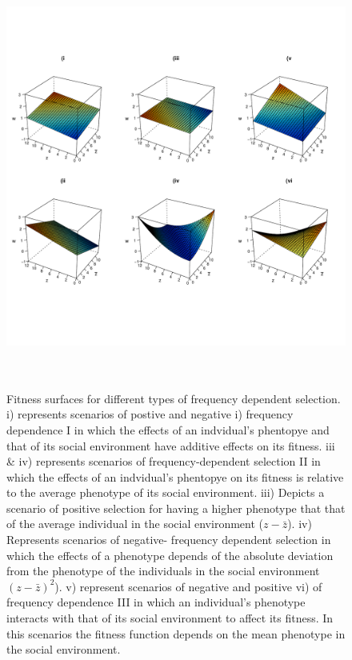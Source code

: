\documentclass{article}
\begin{document}
\begin{figure}[H] 
	\centering
	\includegraphics[width=14cm, height=14cm]{Figures/Box2.pdf}
	\caption{Fitness surfaces for different types of frequency dependent selection. i)  represents scenarios of postive and negative i) frequency dependence I in which the effects of an indvidual's phentopye and that of its social environment have additive effects on its fitness. iii \& iv) represents scenarios of frequency-dependent selection II in which the effects of an indvidual's phentopye on its fitness is relative to the average phenotype of its social environment. iii) Depicts a scenario of positive selection for having a higher phenotype that that of the average individual in the social environment ($z-\bar{z}$). iv) Represents scenarios of negative- frequency dependent selection in which the effects of a phenotype depends of the absolute deviation from the phenotype of the individuals in the social environment $(z-\bar{z})^2$). v) represent scenarios of negative and positive vi) of frequency dependence III in which an individual's phenotype interacts with that of its social environment to affect its fitness. In this scenarios the fitness function depends on the mean phenotype in the social environment.}
	\label{fig:Box2}
\end{figure}
\end{document}
